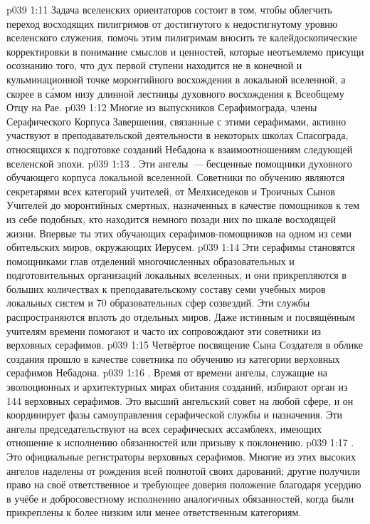 \vs p039 1:11 Задача вселенских ориентаторов состоит в том, чтобы облегчить переход восходящих пилигримов от достигнутого к недостигнутому уровню вселенского служения, помочь этим пилигримам вносить те калейдоскопические корректировки в понимание смыслов и ценностей, которые неотъемлемо присущи осознанию того, что дух первой ступени находится не в конечной и кульминационной точке моронтийного восхождения в локальной вселенной, а скорее в с\'амом низу длинной лестницы духовного восхождения к Всеобщему Отцу на Рае.
\vs p039 1:12 Многие из выпускников Серафимограда, члены Серафического Корпуса Завершения, связанные с этими серафимами, активно участвуют в преподавательской деятельности в некоторых школах Спасограда, относящихся к подготовке созданий Небадона к взаимоотношениям следующей вселенской эпохи.
\vs p039 1:13 . Эти ангелы~--- бесценные помощники духовного обучающего корпуса локальной вселенной. Советники по обучению являются секретарями всех категорий учителей, от Мелхиседеков и Троичных Сынов Учителей до моронтийных смертных, назначенных в качестве помощников к тем из себе подобных, кто находится немного позади них по шкале восходящей жизни. Впервые ты  этих обучающих серафимов\hyp{}помощников на одном из семи обительских миров, окружающих Иерусем.
\vs p039 1:14 Эти серафимы становятся помощниками глав отделений многочисленных образовательных и подготовительных организаций локальных вселенных, и они прикрепляются в больших количествах к преподавательскому составу семи учебных миров локальных систем и 70 образовательных сфер созвездий. Эти службы распространяются вплоть до отдельных миров. Даже истинным и посвящённым учителям времени помогают и часто их сопровождают эти советники из верховных серафимов.
\vs p039 1:15 Четвёртое посвящение Сына Создателя в облике создания прошло в качестве советника по обучению из категории верховных серафимов Небадона.
\vs p039 1:16 . Время от времени ангелы, служащие на эволюционных и архитектурных мирах обитания созданий, избирают орган из 144 верховных серафимов. Это высший ангельский совет на любой сфере, и он координирует фазы самоуправления серафической службы и назначения. Эти ангелы председательствуют на всех серафических ассамблеях, имеющих отношение к исполнению обязанностей или призыву к поклонению.
\vs p039 1:17 . Это официальные регистраторы верховных серафимов. Многие из этих высоких ангелов наделены от рождения всей полнотой своих дарований; другие получили право на своё ответственное и требующее доверия положение благодаря усердию в учёбе и добросовестному исполнению аналогичных обязанностей, когда были прикреплены к более низким или менее ответственным категориям.
